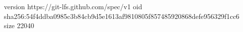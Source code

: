 version https://git-lfs.github.com/spec/v1
oid sha256:54f4ddba0985c3b84cb9d5e1613af9810805f857485920868defe956329f1cc6
size 22040
